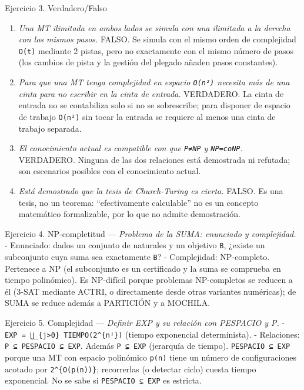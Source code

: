 \documentclass[12pt]{book} %
\providecommand{\tightlist}{%
  \setlength{\itemsep}{0pt}\setlength{\parskip}{0pt}}
\begin{document}
Ejercicio 3. Verdadero/Falso

\begin{enumerate}
\def\labelenumi{\arabic{enumi}.}
\tightlist
\item
  \emph{Una MT ilimitada en ambos lados se simula con una ilimitada a la
  derecha con los mismos pasos.} FALSO. Se simula con el mismo orden de
  complejidad \texttt{O(t)} mediante 2 pistas, pero no exactamente con
  el mismo número de pasos (los cambios de pista y la gestión del
  plegado añaden pasos constantes).
\item
  \emph{Para que una MT tenga complejidad en espacio \texttt{O(n²)}
  necesita más de una cinta para no escribir en la cinta de entrada.}
  VERDADERO. La cinta de entrada no se contabiliza solo si no se
  sobrescribe; para disponer de espacio de trabajo \texttt{O(n²)} sin
  tocar la entrada se requiere al menos una cinta de trabajo separada.
\item
  \emph{El conocimiento actual es compatible con que \texttt{P≠NP} y
  \texttt{NP=coNP}.} VERDADERO. Ninguna de las dos relaciones está
  demostrada ni refutada; son escenarios posibles con el conocimiento
  actual.
\item
  \emph{Está demostrado que la tesis de Church-Turing es cierta.} FALSO.
  Es una tesis, no un teorema: ``efectivamente calculable'' no es un
  concepto matemático formalizable, por lo que no admite demostración.
\end{enumerate}

Ejercicio 4. NP-completitud --- \emph{Problema de la SUMA: enunciado y
complejidad.} - Enunciado: dados un conjunto de naturales y un objetivo
\texttt{B}, ¿existe un subconjunto cuya suma sea exactamente \texttt{B}?
- Complejidad: NP-completo. Pertenece a NP (el subconjunto es un
certificado y la suma se comprueba en tiempo polinómico). Es NP-difícil
porque problemas NP-completos se reducen a él (3-SAT mediante ACTRI, o
directamente desde otras variantes numéricas); de SUMA se reduce además
a PARTICIÓN y a MOCHILA.

Ejercicio 5. Complejidad --- \emph{Definir EXP y su relación con
PESPACIO y P.} -
\texttt{EXP\ =\ ⋃\_\{j\textgreater{}0\}\ TIEMPO(2\^{}\{nʲ\})} (tiempo
exponencial determinista). - Relaciones:
\texttt{P\ ⊆\ PESPACIO\ ⊆\ EXP}. Además \texttt{P\ ⊊\ EXP} (jerarquía de
tiempo). \texttt{PESPACIO\ ⊆\ EXP} porque una MT con espacio polinómico
\texttt{p(n)} tiene un número de configuraciones acotado por
\texttt{2\^{}\{O(p(n))\}}; recorrerlas (o detectar ciclo) cuesta tiempo
exponencial. No se sabe si \texttt{PESPACIO\ ⊊\ EXP} es estricta.
\end{document}
